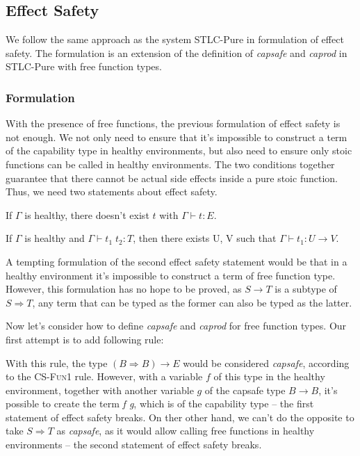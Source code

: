 \subsection{Effect Safety}

We follow the same approach as the system STLC-Pure in formulation of
effect safety. The formulation is an extension of the definition of
\emph{capsafe} and \emph{caprod} in STLC-Pure with free function
types.

\subsubsection{Formulation}

With the presence of free functions, the previous formulation of
effect safety is not enough. We not only need to ensure that it's
impossible to construct a term of the capability type in healthy
environments, but also need to ensure only stoic functions can be
called in healthy environments. The two conditions together guarantee
that there cannot be actual side effects inside a pure stoic
function. Thus, we need two statements about effect safety.

\begin{definition}
  If $\Gamma$ is healthy, there doesn't exist $t$ with
  $\Gamma \vdash t : E$.
\end{definition}

\begin{definition}
  If $\Gamma$ is healthy and $\Gamma \vdash t_1 \; t_2 : T$, then
  there exists U, V such that $\Gamma \vdash t_1 : U \to V$.
\end{definition}

A tempting formulation of the second effect safety statement would be
that in a healthy environment it's impossible to construct a term of
free function type. However, this formulation has no hope to be
proved, as $S \to T$ is a subtype of $S \Rightarrow T$, any term that
can be typed as the former can also be typed as the latter.

Now let's consider how to define \emph{capsafe} and \emph{caprod} for
free function types. Our first attempt is to add following rule:


With this rule, the type $(B \Rightarrow B) \to E$ would be considered
\emph{capsafe}, according to the \textsc{CS-Fun1} rule. However, with
a variable $f$ of this type in the healthy environment, together with
another variable $g$ of the capsafe type $B \to B$, it's possible to
create the term \emph{f g}, which is of the capability type -- the
first statement of effect safety breaks. On ther other hand, we can't
do the opposite to take $S \Rightarrow T$ as \emph{capsafe}, as it
would allow calling free functions in healthy environments -- the
second statement of effect safety breaks.

